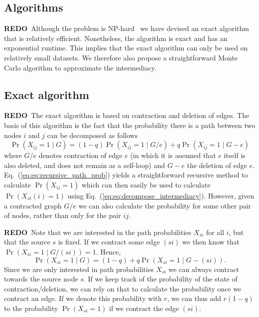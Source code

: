 \documentclass{article}
\theoremstyle{definition}
\renewcommand{\eqref}[1]{Eq.~(\ref{eq:#1})\xspace}
\newcommand{\redo}[1]{{\bf\color{orange}REDO}~{\color{blue}#1}}
\begin{document}
\subsection{Algorithms}

\redo{Although the problem is NP-hard~\cite{Johnsona} we have devised an exact algorithm that is relatively efficient. 
Nonetheless, the algorithm is exact and has an exponential runtime.
This implies that the exact algorithm can only be used on relatively small datasets.
We therefore also propose a straightforward Monte Carlo algorithm to approximate the intermediacy.}

\subsection{Exact algorithm}

\redo{The exact algorithm is based on contraction and deletion of edges.
The basis of this algorithm is the fact that the probability there is a path between two nodes $i$ and $j$ can be decomposed as follows~\cite{Johnsona}
\begin{equation}
	\Pr(X_{ij} = 1 \mid G) = (1 - q) \Pr(X_{ij} = 1 \mid G/e) + q \Pr(X_{ij} = 1 \mid G - e)
\label{eq:recursive_path_prob}
\end{equation}
where $G/e$ denotes contraction of edge $e$ (in which it is assumed that $e$ itself is also deleted, and does not remain as a self-loop) and $G - e$ the deletion of edge $e$.
\eqref{eq:recursive_path_prob} yields a straightforward recursive method to calculate $\Pr(X_{ij} = 1)$ which can then easily be used to calculate $\Pr(X_{st}(i) = 1)$ using \eqref{eq:decompose_intermediacy}.
However, given a contracted graph $G/e$ we can also calculate the probability for some other pair of nodes, rather than only for the pair $ij$.}

\redo{Note that we are interested in the path probabilities $X_{si}$ for all $i$, but that the source $s$ is fixed.
If we contract some edge $(si)$ we then know that $\Pr(X_{si} = 1 \mid G/(si)) = 1$.
Hence, 
\begin{equation}
  \Pr(X_{si} = 1 \mid G) = (1 - q) + q \Pr(X_{si} = 1 \mid G - (si)).
\end{equation}
Since we are only interested in path probabilities $X_{si}$ we can always contract towards the source node $s$.
If we keep track of the probability of the state of contraction/deletion, we can rely on that to calculate the probability once we contract an edge.
If we denote this probability with $r$, we can thus add $r(1 - q)$ to the probability $\Pr(X_{si} = 1)$ if we contract the edge $(si)$.}
\end{document}
